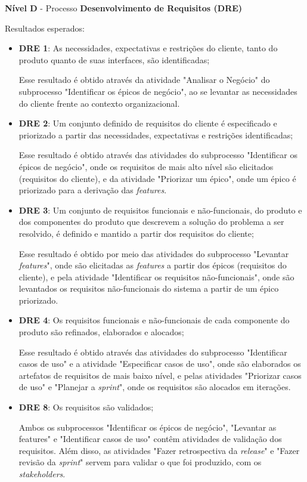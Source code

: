       \noindent
      \textbf{Nível D} - Processo \textbf{Desenvolvimento de Requisitos (DRE)}
	  
	  \noindent
	  Resultados esperados:
	  
	  \begin{itemize}
	  
	  \item \textbf{DRE 1}: As necessidades, expectativas e restrições do cliente, tanto do produto quanto
	    de suas interfaces, são identificadas;
	    
	    Esse resultado é obtido através da atividade "Analisar o Negócio" do subprocesso "Identificar os épicos de negócio",
	    ao se levantar as necessidades do cliente frente ao contexto organizacional.
	  
	  \item \textbf{DRE 2}: Um conjunto definido de requisitos do cliente é especificado e priorizado a partir das
	    necessidades, expectativas e restrições identificadas;
	    
	    Esse resultado é obtido através das atividades do subprocesso "Identificar os épicos de negócio", onde os
	    requisitos de mais alto nível são elicitados (requisitos do cliente), e da atividade "Priorizar um épico", onde 
	    um épico é priorizado para a derivação das \textit{features}.
	  
	  \item \textbf{DRE 3}: Um conjunto de requisitos funcionais e não-funcionais, do produto e dos componentes do produto
	    que descrevem a solução do problema a ser resolvido, é definido e mantido a partir dos requisitos do cliente;
	    
	    Esse resultado é obtido por meio das atividades do subprocesso "Levantar \textit{features}", onde são elicitadas
	    as \textit{features} a partir dos épicos (requisitos do cliente), e pela atividade
	    "Identificar os requisitos não-funcionais", onde são levantados os requisitos não-funcionais do sistema a partir de
	    um épico priorizado.
	    
	  \item \textbf{DRE 4}: Os requisitos funcionais e não-funcionais de cada componente do produto são refinados, 
	    elaborados e alocados;
	    
	    Esse resultado é obtido através das atividades do subprocesso "Identificar casos de uso" e a atividade
	    "Especificar casos de uso", onde são elaborados
	    os artefatos de requisitos de mais baixo nível, e pelas atividades "Priorizar casos de uso" e 
	    "Planejar a \textit{sprint}", onde os requisitos são alocados em iterações. 
	    
	  \item \textbf{DRE 8}: Os requisitos são validados;
	  
	     Ambos os subprocessos "Identificar os épicos de negócio", "Levantar as features" e "Identificar casos de uso"  contêm
	     atividades de validação dos requisitos. Além disso, as atividades "Fazer retrospectiva da \textit{release}" e 
	     "Fazer revisão da \textit{sprint}" servem para validar o que foi produzido, com os \textit{stakeholders}.
	  
	  \end{itemize}
	  
	  
	  \vfill